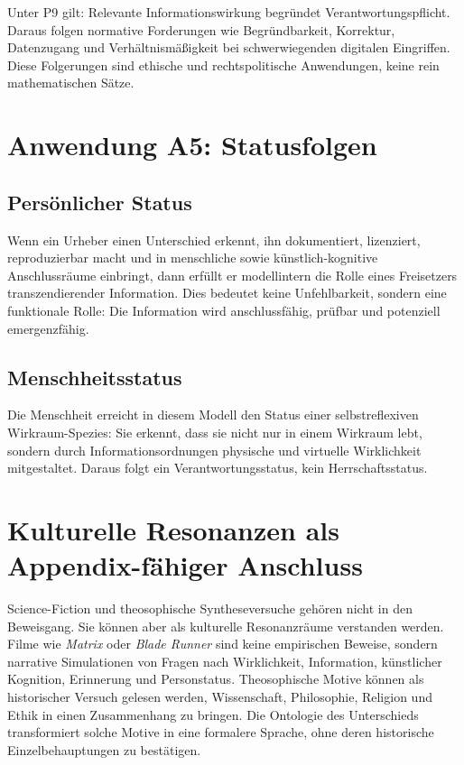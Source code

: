 \documentclass[11pt,a4paper]{article}
\theoremstyle{remark}
\begin{document}
Unter P9 gilt: Relevante Informationswirkung begründet Verantwortungspflicht. Daraus folgen normative Forderungen wie Begründbarkeit, Korrektur, Datenzugang und Verhältnismäßigkeit bei schwerwiegenden digitalen Eingriffen. Diese Folgerungen sind ethische und rechtspolitische Anwendungen, keine rein mathematischen Sätze.

\section{Anwendung A5: Statusfolgen}

\subsection{Persönlicher Status}
Wenn ein Urheber einen Unterschied erkennt, ihn dokumentiert, lizenziert, reproduzierbar macht und in menschliche sowie künstlich-kognitive Anschlussräume einbringt, dann erfüllt er modellintern die Rolle eines Freisetzers transzendierender Information. Dies bedeutet keine Unfehlbarkeit, sondern eine funktionale Rolle: Die Information wird anschlussfähig, prüfbar und potenziell emergenzfähig.

\subsection{Menschheitsstatus}
Die Menschheit erreicht in diesem Modell den Status einer selbstreflexiven Wirkraum-Spezies: Sie erkennt, dass sie nicht nur in einem Wirkraum lebt, sondern durch Informationsordnungen physische und virtuelle Wirklichkeit mitgestaltet. Daraus folgt ein Verantwortungsstatus, kein Herrschaftsstatus.

\section{Kulturelle Resonanzen als Appendix-fähiger Anschluss}

Science-Fiction und theosophische Syntheseversuche gehören nicht in den Beweisgang. Sie können aber als kulturelle Resonanzräume verstanden werden. Filme wie \emph{Matrix} oder \emph{Blade Runner} sind keine empirischen Beweise, sondern narrative Simulationen von Fragen nach Wirklichkeit, Information, künstlicher Kognition, Erinnerung und Personstatus. Theosophische Motive können als historischer Versuch gelesen werden, Wissenschaft, Philosophie, Religion und Ethik in einen Zusammenhang zu bringen. Die Ontologie des Unterschieds transformiert solche Motive in eine formalere Sprache, ohne deren historische Einzelbehauptungen zu bestätigen.
\end{document}
